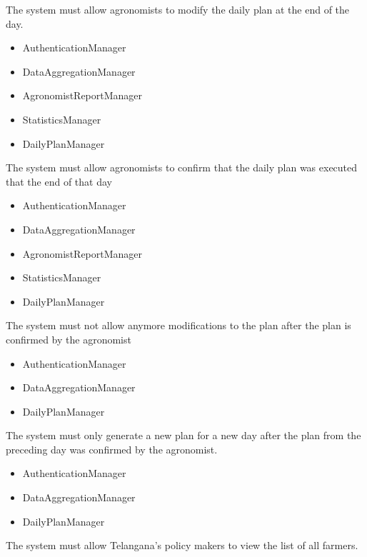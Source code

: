 \begin{itemize}
\begin{itemize}
\end{itemize}
 The system must allow agronomists to modify the daily plan at the end of the day.
\begin{itemize}

\item AuthenticationManager
\item DataAggregationManager
\item AgronomistReportManager
\item StatisticsManager
\item DailyPlanManager

\end{itemize}
 The system must allow agronomists to confirm that the daily plan was executed that the end of that day
\begin{itemize}

\item AuthenticationManager
\item DataAggregationManager
\item AgronomistReportManager
\item StatisticsManager
\item DailyPlanManager

\end{itemize}

 The system must not allow anymore modifications to the plan after the plan is confirmed by the agronomist
\begin{itemize}

\item AuthenticationManager
\item DataAggregationManager
\item DailyPlanManager

\end{itemize}

 The system must only generate a new plan for a new day after the plan from the preceding day was confirmed by the agronomist.
\begin{itemize}

\item AuthenticationManager
\item DataAggregationManager
\item DailyPlanManager

\end{itemize}
 The system must allow Telangana’s policy makers to view the list of all farmers.
\begin{itemize}


\end{itemize}
\end{itemize}
